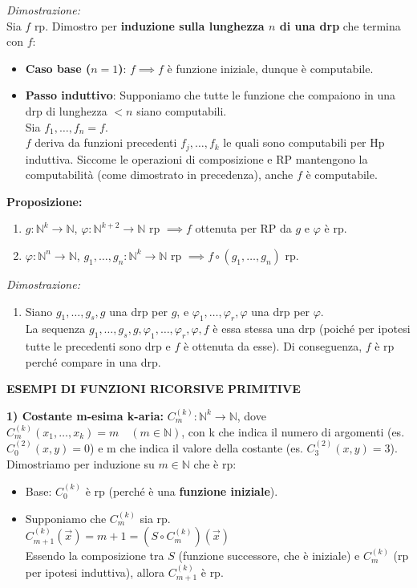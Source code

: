 \textit{Dimostrazione:} \\
Sia $f$ rp. Dimostro per \textbf{induzione sulla lunghezza $n$ di una drp} che termina con $f$:
\begin{itemize}
    \item \textbf{Caso base ($n=1$)}: $f \implies f$ è funzione iniziale, dunque è computabile.
    \item \textbf{Passo induttivo}: Supponiamo che tutte le funzione che compaiono in una drp di lunghezza $< n$ siano computabili. \\
    Sia $f_1, \dots, f_n = f$. \\
    $f$ deriva da funzioni precedenti $f_j, \dots, f_k$ le quali sono computabili per Hp induttiva. Siccome le operazioni di composizione e RP mantengono la computabilità (come dimostrato in precedenza), anche $f$ è computabile.
\end{itemize}

\vspace{0.6cm}
\textbf{Proposizione:}
\begin{enumerate}
    \item $g: \mathbb{N}^k \to \mathbb{N}$, $\varphi: \mathbb{N}^{k+2} \to \mathbb{N}$ rp $\implies f$ ottenuta per RP da $g$ e $\varphi$ è rp.
    \item $\varphi: \mathbb{N}^n \to \mathbb{N}$, $g_1, \dots, g_n: \mathbb{N}^k \to \mathbb{N}$ rp $\implies f \circ (g_1, \dots, g_n)$ rp.
\end{enumerate}

\textit{Dimostrazione:}
\begin{enumerate}
    \item Siano $g_1, \dots, g_s, g$ una drp per $g$, e $\varphi_1, \dots, \varphi_r, \varphi$ una drp per $\varphi$. \\
    La sequenza $g_1, \dots, g_s, g, \varphi_1, \dots, \varphi_r, \varphi, f$ è essa stessa una drp (poiché per ipotesi tutte le precedenti sono drp e $f$ è ottenuta da esse). Di conseguenza, $f$ è rp perché compare in una drp.
\end{enumerate}

\vspace{0.6cm}
\textbf{ESEMPI DI FUNZIONI RICORSIVE PRIMITIVE}

\vspace{0.4cm}
\textbf{1) Costante m-esima k-aria:} $C_m^{(k)} : \mathbb{N}^k \to \mathbb{N}$, dove $C_m^{(k)}(x_1, \dots, x_k) = m \quad (m \in \mathbb{N})$, con k che indica il numero di argomenti (es. $C_0^{(2)}(x,y) = 0$) e m che indica il valore della costante (es. $C_3^{(2)}(x,y) = 3$).
Dimostriamo per induzione su $m \in \mathbb{N}$ che è rp:
\begin{itemize}
    \item Base: $C_0^{(k)}$ è rp (perché è una \textbf{funzione iniziale}).
    \item Supponiamo che $C_m^{(k)}$ sia rp. \\
    $C_{m+1}^{(k)}(\vec{x}) = m+1 = (S \circ C_m^{(k)})(\vec{x})$ \\
    Essendo la composizione tra $S$ (funzione successore, che è iniziale) e $C_m^{(k)}$ (rp per ipotesi induttiva), allora $C_{m+1}^{(k)}$ è rp.
\end{itemize}

